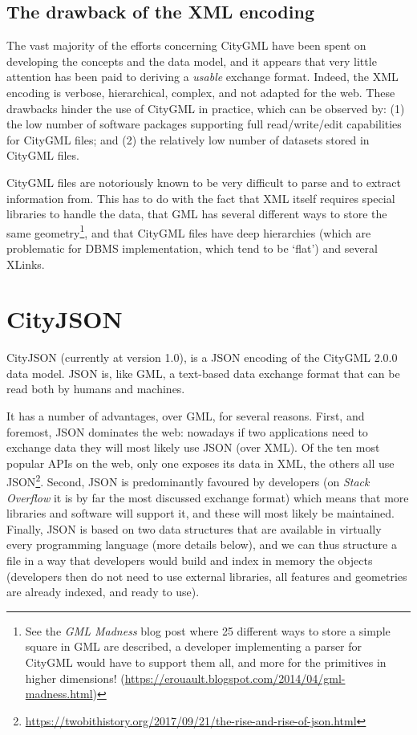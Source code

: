 

\subsection{The drawback of the XML encoding}

The vast majority of the efforts concerning CityGML have been spent on developing the concepts and the data model, and it appears that very little attention has been paid to deriving a \emph{usable} exchange format.
Indeed, the XML encoding is verbose, hierarchical, complex, and not adapted for the web.
These drawbacks hinder the use of CityGML in practice, which can be observed by: (1) the low number of software packages supporting full read/write/edit capabilities for CityGML files; and (2) the relatively low number of datasets stored in CityGML files.

CityGML files are notoriously known to be very difficult to parse and to extract information from.
This has to do with the fact that XML itself requires special libraries to handle the data, that GML has several different ways to store the same geometry\footnote{See the \emph{GML Madness} blog post where 25 different ways to store a simple square in GML are described, a developer implementing a parser for CityGML would have to support them all, and more for the primitives in higher dimensions! (\url{https://erouault.blogspot.com/2014/04/gml-madness.html})}, and that CityGML files have deep hierarchies (which are problematic for DBMS implementation, which tend to be `flat') and several XLinks.



\section{CityJSON}%

CityJSON (currently at version 1.0), is a JSON encoding of the CityGML 2.0.0 data model.
JSON is, like GML, a text-based data exchange format that can be read both by humans and machines.

It has a number of advantages, over GML, for several reasons.
First, and foremost, JSON dominates the web: nowadays if two applications need to exchange data they will most likely use JSON (over XML).
Of the ten most popular APIs on the web, only one exposes its data in XML, the others all use JSON\footnote{\url{https://twobithistory.org/2017/09/21/the-rise-and-rise-of-json.html}}.
Second, JSON is predominantly favoured by developers (on \emph{Stack Overflow} it is by far the most discussed exchange format) which means that more libraries and software will support it, and these will most likely be maintained.
Finally, JSON is based on two data structures that are available in virtually every programming language (more details below), and we can thus structure a file in a way that  developers would build and index in memory the objects (developers then do not need to use external libraries, all features and geometries are already indexed, and ready to use). 

